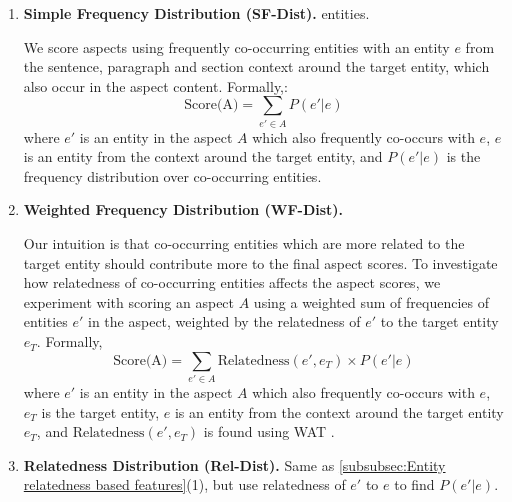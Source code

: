 \begin{enumerate}
    \item \textbf{Simple Frequency Distribution (SF-Dist).} 
entities.
    
    We score aspects using frequently co-occurring entities with an entity $e$ from the sentence, paragraph and section context around the target entity, which also occur in the aspect content. Formally,:
    \begin{equation}
    \label{eq:score-aspect-using-simple-freq-dist}
        \text{Score(A)} = \sum_{e' \in A}P(e' \vert e)
    \end{equation}
    where $e'$ is an entity in the aspect $A$ which also frequently co-occurs with $e$, $e$ is an entity from the context around the target entity, and $P( e' \vert e)$ is the frequency distribution over co-occurring entities.
    
    \item \textbf{Weighted Frequency Distribution (WF-Dist).} 
    
    Our intuition is that co-occurring entities which are more related to the target entity should contribute more to the final aspect scores. To investigate how relatedness of co-occurring entities affects the aspect scores, we experiment with scoring an aspect $A$ using a weighted sum of frequencies of entities $e'$ in the aspect, weighted by the relatedness of $e'$ to the target entity $e_T$. Formally,
\begin{equation}
\label{eq:score-aspect-using-weighted-freq-dist}
    \text{Score(A)} = \sum_{e' \in A} \text{Relatedness}(e', e_T) \times P(e' \vert e)
\end{equation}
where $e'$ is an entity in the aspect $A$ which also frequently co-occurs with $e$, $e_T$ is the target entity, $e$ is an entity from the context around the target entity $e_T$, and $\text{Relatedness}(e', e_T)$ is found using WAT \cite{piccinno2014wat}.

\item \textbf{Relatedness Distribution (Rel-Dist).} 
Same as \ref{subsubsec:Entity relatedness based features}(1), but use relatedness of $e'$ to $e$ to find $P( e' \vert e)$.

\end{enumerate}

